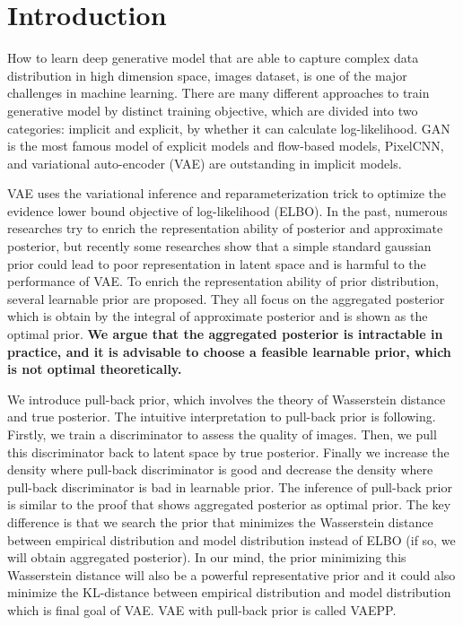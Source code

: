 \section{Introduction}

How to learn deep generative model that are able to capture complex data distribution in high dimension space, \IE images dataset, is one of the major challenges in machine learning. There are many different approaches to train generative model by distinct training objective, which are divided into two categories: implicit and explicit, by whether it can calculate log-likelihood. GAN is the most famous model of explicit models and flow-based models, PixelCNN, and variational auto-encoder (VAE) are outstanding in implicit models. 

VAE uses the variational inference and reparameterization trick to optimize the evidence lower bound objective of log-likelihood (ELBO). In the past, numerous researches try to enrich the representation ability of posterior and approximate posterior, but recently some researches show that a simple standard gaussian prior could lead to poor representation in latent space and is harmful to the performance of VAE. To enrich the representation ability of prior distribution, several learnable prior are proposed. They all focus on the aggregated posterior which is obtain by the integral of approximate posterior and is shown as the optimal prior. \textbf{We argue that the aggregated posterior is intractable in practice, and it is advisable to choose a feasible learnable prior, which is not optimal theoretically. } 

We introduce pull-back prior, which involves the theory of Wasserstein distance and true posterior. The intuitive interpretation to pull-back prior is following. Firstly, we train a discriminator to assess the quality of images. Then, we pull this discriminator back to latent space by true posterior. Finally we increase the density where pull-back discriminator is good and decrease the density where pull-back discriminator is bad in learnable prior. The inference of pull-back prior is similar to the proof that shows aggregated posterior as optimal prior. The key difference is that we search the prior that minimizes the Wasserstein distance between empirical distribution and model distribution instead of ELBO (if so, we will obtain aggregated posterior). In our mind, the prior minimizing this Wasserstein distance will also be a powerful representative prior and it could also minimize the KL-distance between empirical distribution and model distribution which is final goal of VAE. VAE with pull-back prior is called VAEPP. 

